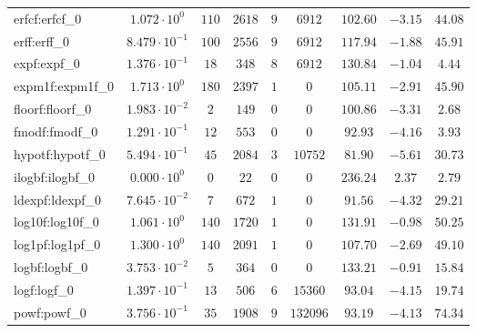 \begin{tabular}{|l|c|c|c|c|c|c|c|c|}
erfcf:erfcf\_0               & $ 1.072 \cdot 10^{0}  $ & $ 110    $ & $ 2618  $ & $ 9   $ & $ 6912   $ & $ 102.60      $ & $ -3.15   $ & $ 44.08   $ \\
erff:erff\_0                 & $ 8.479 \cdot 10^{-1} $ & $ 100    $ & $ 2556  $ & $ 9   $ & $ 6912   $ & $ 117.94      $ & $ -1.88   $ & $ 45.91   $ \\
expf:expf\_0                 & $ 1.376 \cdot 10^{-1} $ & $ 18     $ & $ 348   $ & $ 8   $ & $ 6912   $ & $ 130.84      $ & $ -1.04   $ & $ 4.44    $ \\
expm1f:expm1f\_0             & $ 1.713 \cdot 10^{0}  $ & $ 180    $ & $ 2397  $ & $ 1   $ & $ 0      $ & $ 105.11      $ & $ -2.91   $ & $ 45.90   $ \\
floorf:floorf\_0             & $ 1.983 \cdot 10^{-2} $ & $ 2      $ & $ 149   $ & $ 0   $ & $ 0      $ & $ 100.86      $ & $ -3.31   $ & $ 2.68    $ \\
fmodf:fmodf\_0               & $ 1.291 \cdot 10^{-1} $ & $ 12     $ & $ 553   $ & $ 0   $ & $ 0      $ & $ 92.93       $ & $ -4.16   $ & $ 3.93    $ \\
hypotf:hypotf\_0             & $ 5.494 \cdot 10^{-1} $ & $ 45     $ & $ 2084  $ & $ 3   $ & $ 10752  $ & $ 81.90       $ & $ -5.61   $ & $ 30.73   $ \\
ilogbf:ilogbf\_0             & $ 0.000 \cdot 10^{0}  $ & $ 0      $ & $ 22    $ & $ 0   $ & $ 0      $ & $ 236.24      $ & $ 2.37    $ & $ 2.79    $ \\
ldexpf:ldexpf\_0             & $ 7.645 \cdot 10^{-2} $ & $ 7      $ & $ 672   $ & $ 1   $ & $ 0      $ & $ 91.56       $ & $ -4.32   $ & $ 29.21   $ \\
log10f:log10f\_0             & $ 1.061 \cdot 10^{0}  $ & $ 140    $ & $ 1720  $ & $ 1   $ & $ 0      $ & $ 131.91      $ & $ -0.98   $ & $ 50.25   $ \\
log1pf:log1pf\_0             & $ 1.300 \cdot 10^{0}  $ & $ 140    $ & $ 2091  $ & $ 1   $ & $ 0      $ & $ 107.70      $ & $ -2.69   $ & $ 49.10   $ \\
logbf:logbf\_0               & $ 3.753 \cdot 10^{-2} $ & $ 5      $ & $ 364   $ & $ 0   $ & $ 0      $ & $ 133.21      $ & $ -0.91   $ & $ 15.84   $ \\
logf:logf\_0                 & $ 1.397 \cdot 10^{-1} $ & $ 13     $ & $ 506   $ & $ 6   $ & $ 15360  $ & $ 93.04       $ & $ -4.15   $ & $ 19.74   $ \\
powf:powf\_0                 & $ 3.756 \cdot 10^{-1} $ & $ 35     $ & $ 1908  $ & $ 9   $ & $ 132096 $ & $ 93.19       $ & $ -4.13   $ & $ 74.34   $ \\

\end{tabular}
